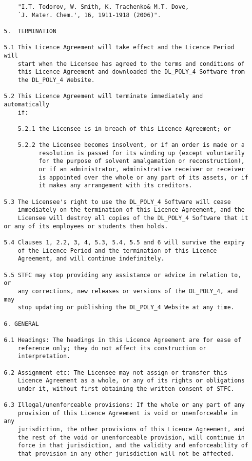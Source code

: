 \begin{verbatim}
    "I.T. Todorov, W. Smith, K. Trachenko& M.T. Dove,
    `J. Mater. Chem.', 16, 1911-1918 (2006)".

5.  TERMINATION

5.1 This Licence Agreement will take effect and the Licence Period will
    start when the Licensee has agreed to the terms and conditions of
    this Licence Agreement and downloaded the DL_POLY_4 Software from
    the DL_POLY_4 Website.

5.2 This Licence Agreement will terminate immediately and automatically
    if:

    5.2.1 the Licensee is in breach of this Licence Agreement; or

    5.2.2 the Licensee becomes insolvent, or if an order is made or a
          resolution is passed for its winding up (except voluntarily
          for the purpose of solvent amalgamation or reconstruction),
          or if an administrator, administrative receiver or receiver
          is appointed over the whole or any part of its assets, or if
          it makes any arrangement with its creditors.

5.3 The Licensee's right to use the DL_POLY_4 Software will cease
    immediately on the termination of this Licence Agreement, and the
    Licensee will destroy all copies of the DL_POLY_4 Software that it
or any of its employees or students then holds.

5.4 Clauses 1, 2.2, 3, 4, 5.3, 5.4, 5.5 and 6 will survive the expiry
    of the Licence Period and the termination of this Licence
    Agreement, and will continue indefinitely.

5.5 STFC may stop providing any assistance or advice in relation to, or
    any corrections, new releases or versions of the DL_POLY_4, and may
    stop updating or publishing the DL_POLY_4 Website at any time.

6. GENERAL

6.1 Headings: The headings in this Licence Agreement are for ease of
    reference only; they do not affect its construction or
    interpretation.

6.2 Assignment etc: The Licensee may not assign or transfer this
    Licence Agreement as a whole, or any of its rights or obligations
    under it, without first obtaining the written consent of STFC.

6.3 Illegal/unenforceable provisions: If the whole or any part of any
    provision of this Licence Agreement is void or unenforceable in any
    jurisdiction, the other provisions of this Licence Agreement, and
    the rest of the void or unenforceable provision, will continue in
    force in that jurisdiction, and the validity and enforceability of
    that provision in any other jurisdiction will not be affected.


\end{verbatim}

